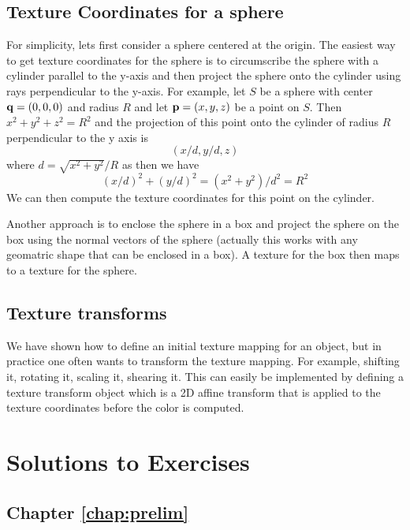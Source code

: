 \documentclass{book}
\newcommand{\vect}[1]{{\bf{ #1}}}
\begin{document}
\section{Texture Coordinates for a sphere}
For simplicity, lets first consider a sphere centered at the origin.
The easiest way to get texture coordinates for the sphere is to circumscribe the sphere with a cylinder parallel to the y-axis
and then project the sphere onto the cylinder using rays perpendicular to the y-axis. For example,
let $S$ be a sphere with center ${\vect q}=(0,0,0)$ and radius $R$ and let ${\vect p}=(x,y,z)$ be a point on $S$.
Then $x^2 + y^2 + z^2 = R^2$ and the projection of this point onto the cylinder of radius $R$ perpendicular to the y axis
is
\[
(x/d,y/d,z)
\]
where $d = \sqrt{x^2+y^2}/R$ as then we have
\[
(x/d)^2 + (y/d)^2 = (x^2 + y^2)/d^2 = R^2
\]
We can then compute the texture coordinates for this point on the cylinder.

Another approach is to enclose the sphere in a box and project the sphere on the box using the normal
vectors of the sphere (actually this works with any geomatric shape that can be enclosed in a box).
A texture for the box then maps to a texture for the sphere.

\section{Texture transforms}
We have shown how to define an initial texture mapping for an object, but in practice one often
wants to transform the texture mapping. For example, shifting it, rotating it, scaling it, shearing it.
This can easily be implemented by defining a texture transform object which is a 2D affine transform
that is applied to the texture coordinates before the color is computed.



\backmatter




\appendix

\chapter{Solutions to Exercises}
\section{Chapter \ref{chap:prelim}}
\end{document}
